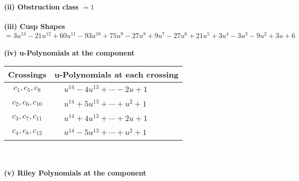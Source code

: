 \documentclass[1p]{elsarticle_modified}
\theoremstyle{definition}
\begin{document}
\flushleft \textbf{(ii) Obstruction class $= 1$}\\~\\
\flushleft \textbf{(iii) Cusp Shapes $= 3 u^{13}-21 u^{12}+60 u^{11}-93 u^{10}+75 u^9-27 u^8+9 u^7-27 u^6+21 u^5+3 u^4-3 u^3-9 u^2+3 u+6$}\\~\\
\newpage\renewcommand{\arraystretch}{1}
\flushleft \textbf{(iv) u-Polynomials at the component}\newline \\
\begin{tabular}{m{50pt}|m{274pt}}
Crossings & \hspace{64pt}u-Polynomials at each crossing \\
\hline $$\begin{aligned}c_{1},c_{5},c_{9}\end{aligned}$$&$\begin{aligned}
&u^{14}-4 u^{13}+\cdots-2 u+1
\end{aligned}$\\
\hline $$\begin{aligned}c_{2},c_{6},c_{10}\end{aligned}$$&$\begin{aligned}
&u^{14}+5 u^{13}+\cdots+u^2+1
\end{aligned}$\\
\hline $$\begin{aligned}c_{3},c_{7},c_{11}\end{aligned}$$&$\begin{aligned}
&u^{14}+4 u^{13}+\cdots+2 u+1
\end{aligned}$\\
\hline $$\begin{aligned}c_{4},c_{8},c_{12}\end{aligned}$$&$\begin{aligned}
&u^{14}-5 u^{13}+\cdots+u^2+1
\end{aligned}$\\
\hline
\end{tabular}\\~\\
\newpage\renewcommand{\arraystretch}{1}
\flushleft \textbf{(v) Riley Polynomials at the component}\newline \\
\end{document}
